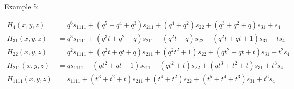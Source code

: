 \documentclass[12pt]{amsart}
\begin{document}
\begin{mdframed}[backgroundcolor=green!10]
	\label{exemple Mac} %
	\begin{it}Example 5: \end{it}
	  \begin{align*}
		H_{4}(x,y,z)&=q^{6}s_{1111} + \left(q^{5} + q^{4} + q^{3}\right)s_{211} + \left(q^{4} + q^{2}\right)s_{22} + \left(q^{3} + q^{2} + q\right)s_{31} + s_{4}
		  \\  H_{31}(x,y,z)&=q^{3}s_{1111} + \left(q^{3} t + q^{2} + q\right)s_{211} + \left(q^{2} t + q\right)s_{22} + \left(q^{2} t + q t + 1\right)s_{31} + ts_{4}
		\\ H_{22}(x,y,z)&=q^{2}s_{1111} + \left(q^{2} t + q t + q\right)s_{211} + \left(q^{2} t^{2} + 1\right)s_{22} + \left(q t^{2} + q t + t\right)s_{31} + t^{2}s_{4}
		\\ H_{211}(x,y,z)&=qs_{1111} + \left(q t^{2} + q t + 1\right)s_{211} + \left(q t^{2} + t\right)s_{22} + \left(q t^{3} + t^{2} + t\right)s_{31} + t^{3}s_{4}
		  \\H_{1111}(x,y,z)&=s_{1111} + \left(t^{3} + t^{2} + t\right)s_{211} + \left(t^{4} + t^{2}\right)s_{22} + \left(t^{5} + t^{4} + t^{3}\right)s_{31} + t^{6}s_{4}
	  \end{align*} 
	\hyperref[retour Mac]{}
\end{mdframed}
\end{document}
